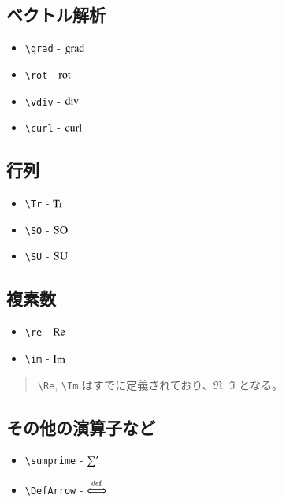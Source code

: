 \documentclass[oneside,10pt,a4paper]{jsarticle}
\begin{document}
  \subsection{ベクトル解析}

  \begin{itemize}
    \item \verb|\grad| - $ \operatorname{grad} $
    \item \verb|\rot| - $ \operatorname{rot} $
    \item \verb|\vdiv| - $ \operatorname{div} $
    \item \verb|\curl| - $ \operatorname{curl} $
  \end{itemize}

  \subsection{行列}

  \begin{itemize}
    \item \verb|\Tr| - $ \operatorname{Tr} $
    \item \verb|\SO| - $ \operatorname{SO} $
    \item \verb|\SU| - $ \operatorname{SU} $
  \end{itemize}

  \subsection{複素数}

  \begin{itemize}
    \item \verb|\re| - $ \operatorname{Re} $
    \item \verb|\im| - $ \operatorname{Im} $
  \end{itemize}

  \Remark
  \begin{quote}
    \verb|\Re|, \verb|\Im| はすでに定義されており、$ \Re $, $ \Im $ となる。
  \end{quote}

  \subsection{その他の演算子など}

  \begin{itemize}
    \item \verb|\sumprime| - $ \operatorname*{{\sum}^{\prime}} $
    \item \verb|\DefArrow| - $ \operatorname{{\stackrel{\mathrm{def}}{\Longleftrightarrow}}} $
  \end{itemize}

  \newpage
\end{document}

